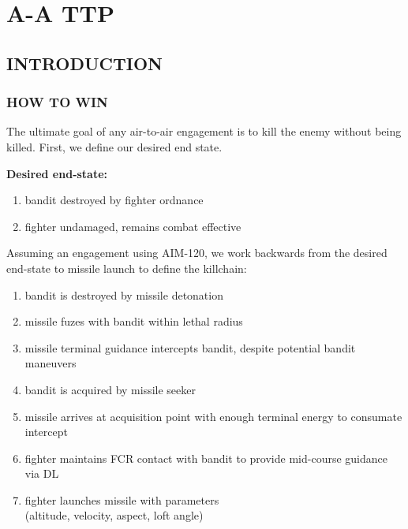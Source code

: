 \chapter{A-A TTP}
\localtableofcontents
\thispagestyle{plain}
\cleardoublepage

\section{INTRODUCTION}
\subsection{HOW TO WIN}
\begin{tcoloritemize}
    \blueitem[Goal]
    The ultimate goal of any air-to-air engagement is to kill the enemy without being killed. 
    First, we define our desired end state.

    \medskip
    \textbf{Desired end-state:}
    \begin{enumerate}[label=\bfseries(\arabic*)]
        \item bandit destroyed by fighter ordnance
        \label{subsec:ttp_aa:intro:howto:endstate:bandit}
        \item fighter undamaged, remains combat effective
        \label{subsec:ttp_aa:intro:howto:endstate:fighter}
    \end{enumerate}

    Assuming an engagement using AIM-120, 
    we work backwards from the desired end-state 
    to missile launch to define the killchain:
    \begin{enumerate}
        \item bandit is destroyed by missile detonation
        \label{subsec:ttp_aa:intro:howto:killchain:destroyed}
        \item missile fuzes with bandit within lethal radius
        \label{subsec:ttp_aa:intro:howto:killchain:fuzes}
        \item missile terminal guidance intercepts bandit, despite potential bandit maneuvers
        \label{subsec:ttp_aa:intro:howto:killchain:terminal}
        \item bandit is acquired by missile seeker
        \label{subsec:ttp_aa:intro:howto:killchain:acquired}
        \item missile arrives at acquisition point with enough terminal energy to consumate intercept
        \label{subsec:ttp_aa:intro:howto:killchain:acqpoint}
        \item fighter maintains FCR contact with bandit to provide mid-course guidance via DL
        \label{subsec:ttp_aa:intro:howto:killchain:midcourse}
        \item fighter launches missile with parameters \\
        \label{subsec:ttp_aa:intro:howto:killchain:launch}
        (altitude, velocity, aspect, loft angle)
    \end{enumerate}


\end{tcoloritemize}
